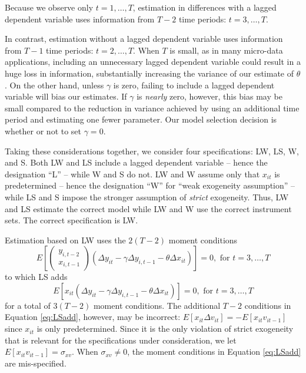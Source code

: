 Because we observe only $t = 1, \hdots, T$, estimation in differences with a lagged dependent variable uses information from $T-2$ time periods: $t = 3, \hdots, T$.

In contrast, estimation without a lagged dependent variable uses information from $T-1$ time periods: $t=2, \hdots, T$.
When $T$ is small, as in many micro-data applications, including an unnecessary lagged dependent variable could result in a huge loss in information, substantially increasing the variance of our estimate of $\theta$. 
On the other hand, unless $\gamma$ is zero, failing to include a lagged dependent variable will bias our estimates. 
If $\gamma$ is \emph{nearly} zero, however, this bias may be small compared to the reduction in variance achieved by using an additional time period and estimating one fewer parameter. 
Our model selection decision is whether or not to set $\gamma = 0$.  

Taking these considerations together, we consider four specifications: LW, LS, W, and S. 
Both LW and LS include a lagged dependent variable -- hence the designation ``L'' -- while W and S do not. 
LW and W assume only that $x_{it}$ is predetermined -- hence the designation ``W'' for ``weak exogeneity assumption'' -- while LS and S impose the stronger assumption of \emph{strict} exogeneity. 
Thus, LW and LS estimate the correct model while LW and W use the correct instrument sets. 
The correct specification is LW.

Estimation based on LW uses the $2(T - 2)$ moment conditions
	\begin{equation}
E\left[ \left(\begin{array}{c} y_{i,t-2}\\ x_{i,t-1}
\end{array}\right)\left(\Delta y_{it} - \gamma\Delta y_{i,t-1} -\theta \Delta x_{it}\right)\right] = 0, \mbox{ for } t = 3, \hdots, T
\end{equation}
to which LS adds 
	\begin{equation}
	\label{eq:LSadd}
	E\left[ x_{it}\left(\Delta y_{it} - \gamma\Delta y_{i,t-1} -\theta \Delta x_{it}\right)\right] = 0, \mbox{ for } t = 3, \hdots, T
\end{equation}
for a total of $3(T - 2)$ moment conditions. The additional $T-2$ conditions in Equation \ref{eq:LSadd}, however, may be incorrect: $E[x_{it}\Delta v_{it}] = -E[x_{it}v_{it-1}]$ since $x_{it}$ is only predetermined. Since it is the only violation of strict exogeneity that is relevant for the specifications under consideration, we let $E[x_{it}v_{it-1}] = \sigma_{xv}$. When $\sigma_{xv}\neq 0$, the moment conditions in Equation \ref{eq:LSadd} are mis-specified.



